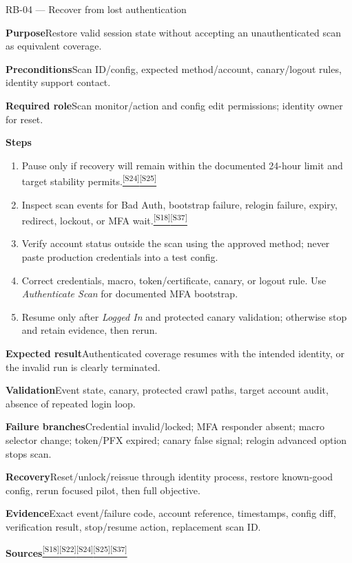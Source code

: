 \documentclass[11pt,letterpaper,oneside]{scrreprt}
\newcommand{\src}[1]{\hyperref[src:#1]{\textsuperscript{\color{R7Orange}[#1]}}}
\newcommand{\field}[1]{\par\smallskip\noindent\textbf{#1}\quad}
\begin{document}
\begin{procedure}{RB-04 --- Recover from lost authentication}
\field{Purpose}Restore valid session state without accepting an unauthenticated scan as equivalent coverage.
\field{Preconditions}Scan ID/config, expected method/account, canary/logout rules, identity support contact.
\field{Required role}Scan monitor/action and config edit permissions; identity owner for reset.
\field{Steps}
\begin{enumerate}
  \item Pause only if recovery will remain within the documented 24-hour limit and target stability permits.\src{S24}\src{S25}
  \item Inspect scan events for Bad Auth, bootstrap failure, relogin failure, expiry, redirect, lockout, or MFA wait.\src{S18}\src{S37}
  \item Verify account status outside the scan using the approved method; never paste production credentials into a test config.
  \item Correct credentials, macro, token/certificate, canary, or logout rule. Use \emph{Authenticate Scan} for documented MFA bootstrap.
  \item Resume only after \emph{Logged In} and protected canary validation; otherwise stop and retain evidence, then rerun.
\end{enumerate}
\field{Expected result}Authenticated coverage resumes with the intended identity, or the invalid run is clearly terminated.
\field{Validation}Event state, canary, protected crawl paths, target account audit, absence of repeated login loop.
\field{Failure branches}Credential invalid/locked; MFA responder absent; macro selector change; token/PFX expired; canary false signal; relogin advanced option stops scan.
\field{Recovery}Reset/unlock/reissue through identity process, restore known-good config, rerun focused pilot, then full objective.
\field{Evidence}Exact event/failure code, account reference, timestamps, config diff, verification result, stop/resume action, replacement scan ID.
\field{Sources}\src{S18}\src{S22}\src{S24}\src{S25}\src{S37}
\end{procedure}
\end{document}

